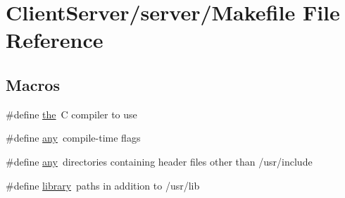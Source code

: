 \hypertarget{ClientServer_2server_2Makefile}{\section{Client\-Server/server/\-Makefile File Reference}
\label{ClientServer_2server_2Makefile}
}
\subsection*{Macros}
\begin{DoxyCompactItemize}
\item 
\#define \hyperlink{ClientServer_2server_2Makefile_a09c6b60bb7451f9136e25140ffdff6bd}{the}~C compiler to use
\item 
\#define \hyperlink{ClientServer_2server_2Makefile_a6120b6f1abea66c8ede7b300a66d4cc0}{any}~compile-\/time flags
\item 
\#define \hyperlink{ClientServer_2server_2Makefile_a6120b6f1abea66c8ede7b300a66d4cc0}{any}~directories containing header files other than /usr/include
\item 
\#define \hyperlink{ClientServer_2server_2Makefile_a1f477410360bd4832116581b9934ab71}{library}~paths in addition to /usr/lib
\end{DoxyCompactItemize}


